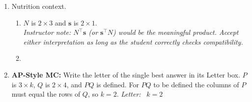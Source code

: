 \documentclass[10pt]{article}
\begin{document}
\begin{enumerate}[leftmargin=1.6em, itemsep=14pt]
\vspace{0.2in}

\item Nutrition context.
\begin{enumerate}[label=(\alph*), itemsep=6pt]
  \item $N$ is $2\times 3$ and $\mathbf{s}$ is $2\times 1$. \\[4pt]
        \textit{Instructor note: $N^{\top}\mathbf{s}$ (or $\mathbf{s}^{\top}N$) would be the meaningful product. Accept either interpretation as long as the student correctly checks compatibility.}
  \item {}
\end{enumerate}

\vspace{0.2in}

\item \textbf{AP-Style MC:} Write the letter of the single best answer in its Letter box. $P$ is $3\times k$, $Q$ is $2\times 4$, and $PQ$ is defined.
For $PQ$ to be defined the columns of $P$ must equal the rows of $Q$, so $k = 2$.
\textit{Letter:}~\gradedblank[id=hw6, type=choice, points=1, answer=A]{0.42in}{13pt} $k = 2$

\end{enumerate}
\end{document}
